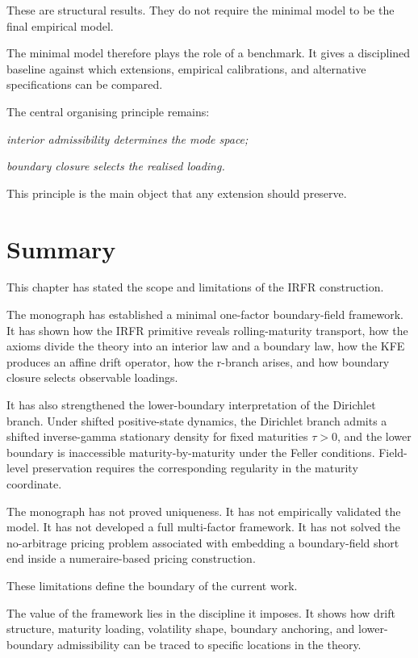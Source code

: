 \documentclass[11pt,oneside]{book}
\begin{document}
These are structural results. They do not require the minimal model to
be the final empirical model.

The minimal model therefore plays the role of a benchmark. It gives a
disciplined baseline against which extensions, empirical calibrations,
and alternative specifications can be compared.

The central organising principle remains:

\begin{center}\emph{interior admissibility determines the mode space;}\end{center}
\begin{center}\emph{boundary closure selects the realised loading.}\end{center}
This principle is the main object that any extension should preserve.

\section{Summary}\label{summary-8}

This chapter has stated the scope and limitations of the IRFR
construction.

The monograph has established a minimal one-factor boundary-field
framework. It has shown how the IRFR primitive reveals rolling-maturity
transport, how the axioms divide the theory into an interior law and a
boundary law, how the KFE produces an affine drift operator, how the
r-branch arises, and how boundary closure selects observable loadings.

It has also strengthened the lower-boundary interpretation of the
Dirichlet branch. Under shifted positive-state dynamics, the Dirichlet
branch admits a shifted inverse-gamma stationary density for fixed
maturities $\tau>0$, and the lower boundary is inaccessible
maturity-by-maturity under the Feller conditions. Field-level
preservation requires the corresponding regularity in the maturity
coordinate.

The monograph has not proved uniqueness. It has not empirically
validated the model. It has not developed a full multi-factor framework.
It has not solved the no-arbitrage pricing problem associated with
embedding a boundary-field short end inside a numeraire-based pricing
construction.

These limitations define the boundary of the current work.

The value of the framework lies in the discipline it imposes. It shows
how drift structure, maturity loading, volatility shape, boundary
anchoring, and lower-boundary admissibility can be traced to specific
locations in the theory.
\end{document}
